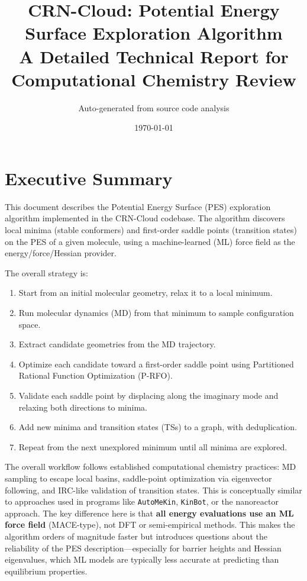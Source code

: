 \documentclass[11pt,a4paper]{article}
\title{\textbf{CRN-Cloud: Potential Energy Surface Exploration Algorithm} \\[0.5em]
\large A Detailed Technical Report for Computational Chemistry Review}
\author{Auto-generated from source code analysis}
\date{\today}
\begin{document}
\maketitle
\tableofcontents
\newpage

\section{Executive Summary}

This document describes the Potential Energy Surface (PES) exploration algorithm implemented in the CRN-Cloud codebase. The algorithm discovers local minima (stable conformers) and first-order saddle points (transition states) on the PES of a given molecule, using a machine-learned (ML) force field as the energy/force/Hessian provider.

The overall strategy is:
\begin{enumerate}
    \item Start from an initial molecular geometry, relax it to a local minimum.
    \item Run molecular dynamics (MD) from that minimum to sample configuration space.
    \item Extract candidate geometries from the MD trajectory.
    \item Optimize each candidate toward a first-order saddle point using Partitioned Rational Function Optimization (P-RFO).
    \item Validate each saddle point by displacing along the imaginary mode and relaxing both directions to minima.
    \item Add new minima and transition states (TSs) to a graph, with deduplication.
    \item Repeat from the next unexplored minimum until all minima are explored.
\end{enumerate}

\begin{evaluation}
The overall workflow follows established computational chemistry practices: MD sampling to escape local basins, saddle-point optimization via eigenvector following, and IRC-like validation of transition states. This is conceptually similar to approaches used in programs like \texttt{AutoMeKin}, \texttt{KinBot}, or the nanoreactor approach. The key difference here is that \textbf{all energy evaluations use an ML force field} (MACE-type), not DFT or semi-empirical methods. This makes the algorithm orders of magnitude faster but introduces questions about the reliability of the PES description---especially for barrier heights and Hessian eigenvalues, which ML models are typically less accurate at predicting than equilibrium properties.
\end{evaluation}
\end{document}
